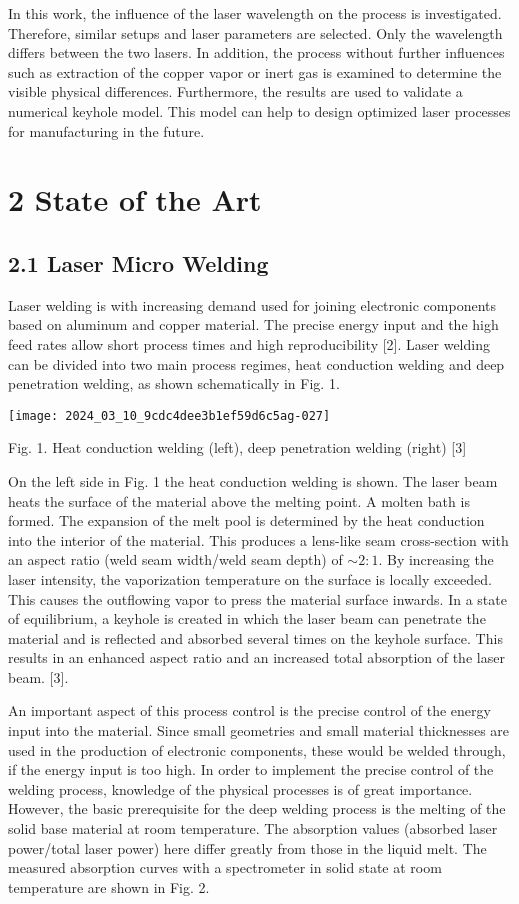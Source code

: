 \documentclass[10pt]{article}
\begin{document}
In this work, the influence of the laser wavelength on the process is investigated. Therefore, similar setups and laser parameters are selected. Only the wavelength differs between the two lasers. In addition, the process without further influences such as extraction of the copper vapor or inert gas is examined to determine the visible physical differences. Furthermore, the results are used to validate a numerical keyhole model. This model can help to design optimized laser processes for manufacturing in the future.

\section*{2 State of the Art}
\subsection*{2.1 Laser Micro Welding}
Laser welding is with increasing demand used for joining electronic components based on aluminum and copper material. The precise energy input and the high feed rates allow short process times and high reproducibility [2]. Laser welding can be divided into two main process regimes, heat conduction welding and deep penetration welding, as shown schematically in Fig. 1.

\begin{center}
\texttt{[image: 2024\_03\_10\_9cdc4dee3b1ef59d6c5ag-027]}
\end{center}

Fig. 1. Heat conduction welding (left), deep penetration welding (right) [3]

On the left side in Fig. 1 the heat conduction welding is shown. The laser beam heats the surface of the material above the melting point. A molten bath is formed. The expansion of the melt pool is determined by the heat conduction into the interior of the material. This produces a lens-like seam cross-section with an aspect ratio (weld seam width/weld seam depth) of $\sim 2: 1$. By increasing the laser intensity, the vaporization temperature on the surface is locally exceeded. This causes the outflowing vapor to press the material surface inwards. In a state of equilibrium, a keyhole is created in which the laser beam can penetrate the material and is reflected and absorbed several times on the keyhole surface. This results in an enhanced aspect ratio and an increased total absorption of the laser beam. [3].

An important aspect of this process control is the precise control of the energy input into the material. Since small geometries and small material thicknesses are used in the production of electronic components, these would be welded through, if the energy input is too high. In order to implement the precise control of the welding process, knowledge of the physical processes is of great importance. However, the basic prerequisite for the deep welding process is the melting of the solid base material at room temperature. The absorption values (absorbed laser power/total laser power) here differ greatly from those in the liquid melt. The measured absorption curves with a spectrometer in solid state at room temperature are shown in Fig. 2.
\end{document}
